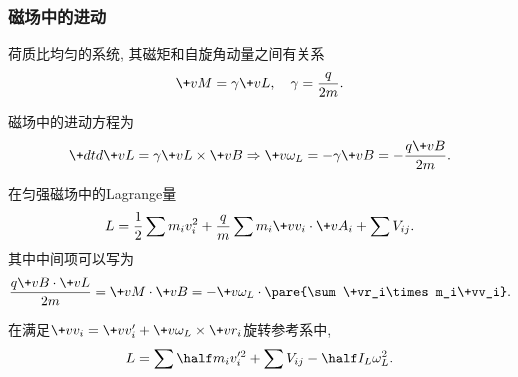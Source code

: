 \documentclass[../TheoreticalMechanics.tex]{subfiles}
\begin{document}

\subsubsection{磁场中的进动} %
\label{ssub:磁场中的进动}

\begin{lemma}[磁旋比]
    荷质比均匀的系统, 其磁矩和自旋角动量之间有关系
    \[ \+vM = \gamma \+vL,\quad \gamma = \frac{q}{2m}. \]
\end{lemma}
\begin{theorem}[磁场中的进动速率]
    磁场中的进动方程为
    \[ \+dtd{\+vL} = \gamma\+vL\times\+vB \Rightarrow \+v\omega_L = -\gamma\+vB = -\frac{q\+vB}{2m}. \]
\end{theorem}
\begin{theorem}[磁场中构型的Lagrange量]
    在匀强磁场中的Lagrange量
    \[ L = \frac{1}{2}\sum m_i v_i^2 + \frac{q}{m}\sum m_i\+vv_i\cdot\+vA_i + \sum V_{ij}. \]
    其中中间项可以写为
    \[ \frac{q\+vB\cdot\+vL}{2m} = \+vM\cdot\+vB = -\+v\omega_L\cdot\pare{\sum \+vr_i\times m_i\+vv_i}. \]
\end{theorem}
\begin{finale}
    \begin{theorem}[Larmor参考系]
        在满足$\+vv_i = \+vv'_i + \+v\omega_L\times\+vr_i$旋转参考系中,
        \[ L = \sum \half m_i v'^2_i + \sum V_{ij} - \half I_L \omega_L^2. \]
    \end{theorem}
\end{finale}



\end{document}
